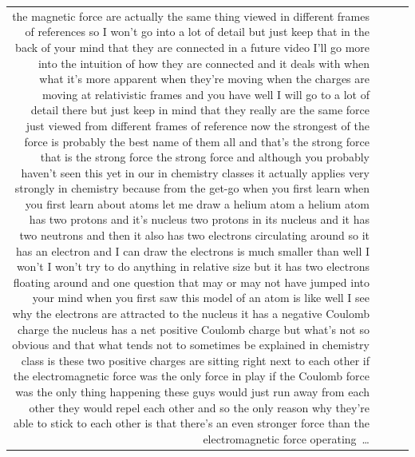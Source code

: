 \documentclass[10pt]{article}
\begin{document}
\begin{tiny}
\begin{longtable}{r p{0.3in} p{1.212in} p{3.8in}}
the magnetic force are actually the same thing viewed in different frames of references so I won't go into a lot of detail but just keep that in the back of your mind that they are connected in a future video I'll go more into the intuition of how they are connected and it deals with when what it's more apparent when they're moving when the charges are moving at relativistic frames and you have well I will go to a lot of detail there but just keep in mind that they really are the same force just viewed from different frames of reference now the strongest of the force is probably the best name of them all and that's the strong force that is the strong force the strong force and although you probably haven't seen this yet in our in chemistry classes it actually applies very strongly in chemistry because from the get-go when you first learn when you first learn about atoms let me draw a helium atom a helium atom has two protons and it's nucleus two protons in its nucleus and it has two neutrons and then it also has two electrons circulating around so it has an electron and I can draw the electrons is much smaller than well I won't I won't try to do anything in relative size but it has two electrons floating around and one question that may or may not have jumped into your mind when you first saw this model of an atom is like well I see why the electrons are attracted to the nucleus it has a negative Coulomb charge the nucleus has a net positive Coulomb charge but what's not so obvious and that what tends not to sometimes be explained in chemistry class is these two positive charges are sitting right next to each other if the electromagnetic force was the only force in play if the Coulomb force was the only thing happening these guys would just run away from each other they would repel each other and so the only reason why they're able to stick to each other is that there's an even stronger force than the electromagnetic force operating~\ldots \\

\end{longtable}
\end{tiny}
\end{document}
